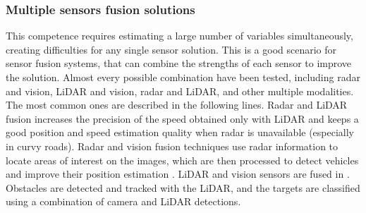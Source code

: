 
\subsubsection{Multiple sensors fusion solutions}
This competence requires estimating a large number of variables simultaneously,
creating difficulties for any single sensor solution. This is a good scenario
for sensor fusion systems, that can combine the strengths of each sensor to
improve the solution. 
Almost every possible combination have been tested, including radar and vision, 
LiDAR and vision, radar and LiDAR, and other multiple 
modalities. The most common ones are described in the following lines.
Radar and LiDAR fusion \cite{gohring2011radar} increases the precision of 
the speed obtained only with LiDAR and keeps a good position and speed 
estimation quality when radar is unavailable (especially in curvy roads).
Radar and vision fusion techniques use radar information to locate areas of 
interest on the images, which are then processed to detect vehicles and improve 
their position estimation \cite{alessandretti2007vehicle}.
LiDAR and vision sensors are fused in \cite{premebida2007lidar}. Obstacles
are detected and tracked with the LiDAR, and the targets are classified using
a combination of camera and LiDAR detections.

